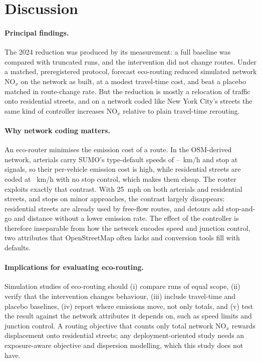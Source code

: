 \documentclass[11pt]{article}
\begin{document}
\section{Discussion}\label{sec:discussion}
\paragraph{Principal findings.} The 2024 reduction was produced by its measurement: a full baseline was compared
with truncated runs, and the intervention did not change routes. Under a matched, preregistered protocol, forecast
eco-routing reduced simulated network NO$_x$ on the network as built, at a modest travel-time cost, and beat a
placebo matched in route-change rate. But the reduction is mostly a relocation of traffic onto residential streets,
and on a network coded like New York City's streets the same kind of controller increases NO$_x$ relative to plain
travel-time rerouting.

\paragraph{Why network coding matters.} An eco-router minimises the emission cost of a route. In the OSM-derived
network, arterials carry SUMO's type-default speeds of \SpeedTertiary--\SpeedPrimSec~km/h and stop at signals, so their per-vehicle
emission cost is high, while residential streets are coded at \SpeedResid~km/h with no stop control, which makes them cheap.
The router exploits exactly that contrast. With 25~mph on both arterials and residential streets, and stops on minor
approaches, the contrast largely disappears: residential streets are already used by free-flow routes, and detours
add stop-and-go and distance without a lower emission rate. The effect of the controller is therefore inseparable
from how the network encodes speed and junction control, two attributes that OpenStreetMap often lacks and
conversion tools fill with defaults.

\paragraph{Implications for evaluating eco-routing.} Simulation studies of eco-routing should (i) compare runs of
equal scope, (ii) verify that the intervention changes behaviour, (iii) include travel-time and placebo baselines,
(iv) report where emissions move, not only totals, and (v) test the result against the network attributes it depends
on, such as speed limits and junction control. A routing objective that counts only total network NO$_x$ rewards
displacement onto residential streets; any deployment-oriented study needs an exposure-aware objective and dispersion
modelling, which this study does not have.
\end{document}
